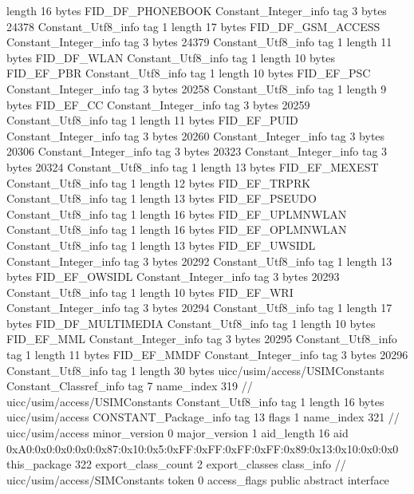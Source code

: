 {{{			length	16
			bytes	FID_DF_PHONEBOOK
		}
		Constant_Integer_info {
			tag	3
			bytes	24378
		}
		Constant_Utf8_info {
			tag	1
			length	17
			bytes	FID_DF_GSM_ACCESS
		}
		Constant_Integer_info {
			tag	3
			bytes	24379
		}
		Constant_Utf8_info {
			tag	1
			length	11
			bytes	FID_DF_WLAN
		}
		Constant_Utf8_info {
			tag	1
			length	10
			bytes	FID_EF_PBR
		}
		Constant_Utf8_info {
			tag	1
			length	10
			bytes	FID_EF_PSC
		}
		Constant_Integer_info {
			tag	3
			bytes	20258
		}
		Constant_Utf8_info {
			tag	1
			length	9
			bytes	FID_EF_CC
		}
		Constant_Integer_info {
			tag	3
			bytes	20259
		}
		Constant_Utf8_info {
			tag	1
			length	11
			bytes	FID_EF_PUID
		}
		Constant_Integer_info {
			tag	3
			bytes	20260
		}
		Constant_Integer_info {
			tag	3
			bytes	20306
		}
		Constant_Integer_info {
			tag	3
			bytes	20323
		}
		Constant_Integer_info {
			tag	3
			bytes	20324
		}
		Constant_Utf8_info {
			tag	1
			length	13
			bytes	FID_EF_MEXEST
		}
		Constant_Utf8_info {
			tag	1
			length	12
			bytes	FID_EF_TRPRK
		}
		Constant_Utf8_info {
			tag	1
			length	13
			bytes	FID_EF_PSEUDO
		}
		Constant_Utf8_info {
			tag	1
			length	16
			bytes	FID_EF_UPLMNWLAN
		}
		Constant_Utf8_info {
			tag	1
			length	16
			bytes	FID_EF_OPLMNWLAN
		}
		Constant_Utf8_info {
			tag	1
			length	13
			bytes	FID_EF_UWSIDL
		}
		Constant_Integer_info {
			tag	3
			bytes	20292
		}
		Constant_Utf8_info {
			tag	1
			length	13
			bytes	FID_EF_OWSIDL
		}
		Constant_Integer_info {
			tag	3
			bytes	20293
		}
		Constant_Utf8_info {
			tag	1
			length	10
			bytes	FID_EF_WRI
		}
		Constant_Integer_info {
			tag	3
			bytes	20294
		}
		Constant_Utf8_info {
			tag	1
			length	17
			bytes	FID_DF_MULTIMEDIA
		}
		Constant_Utf8_info {
			tag	1
			length	10
			bytes	FID_EF_MML
		}
		Constant_Integer_info {
			tag	3
			bytes	20295
		}
		Constant_Utf8_info {
			tag	1
			length	11
			bytes	FID_EF_MMDF
		}
		Constant_Integer_info {
			tag	3
			bytes	20296
		}
		Constant_Utf8_info {
			tag	1
			length	30
			bytes	uicc/usim/access/USIMConstants
		}
		Constant_Classref_info {
			tag	7
			name_index	319		// uicc/usim/access/USIMConstants
		}
		Constant_Utf8_info {
			tag	1
			length	16
			bytes	uicc/usim/access
		}
		CONSTANT_Package_info {
			tag	13
			flags	1
			name_index	321		// uicc/usim/access
			minor_version	0
			major_version	1
			aid_length	16
			aid	0xA0:0x0:0x0:0x0:0x87:0x10:0x5:0xFF:0xFF:0xFF:0xFF:0x89:0x13:0x10:0x0:0x0
		}
	}
	this_package	322
	export_class_count	2
	export_classes {
		class_info {		// uicc/usim/access/SIMConstants
			token	0
			access_flags	public abstract interface
}}}
